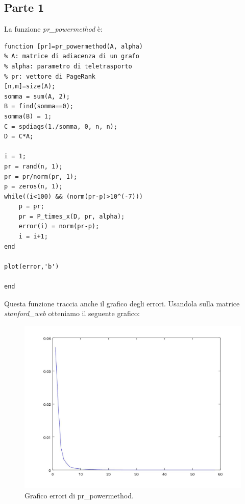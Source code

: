 \documentclass[11pt,a4paper,twoside,openright,titlepage,
                           headinclude,footinclude,BCOR5mm,
                           numbers=noenddot,cleardoublepage=empty,
                           tablecaptionabove]{scrbook}
\begin{document}
\subsection{\textbf{Parte 1}}
La funzione \emph{pr\_powermethod} è:
\begin{lstlisting}[frame=trBL]
function [pr]=pr_powermethod(A, alpha)
% A: matrice di adiacenza di un grafo
% alpha: parametro di teletrasporto
% pr: vettore di PageRank
[n,m]=size(A);
somma = sum(A, 2);
B = find(somma==0);
somma(B) = 1;
C = spdiags(1./somma, 0, n, n);
D = C*A;

i = 1;
pr = rand(n, 1);
pr = pr/norm(pr, 1);
p = zeros(n, 1);
while((i<100) && (norm(pr-p)>10^(-7)))
    p = pr;
    pr = P_times_x(D, pr, alpha);
    error(i) = norm(pr-p);
    i = i+1;
end

plot(error,'b')

end
\end{lstlisting}
Questa funzione traccia anche il grafico degli errori. Usandola sulla matrice \emph{stanford\_web} otteniamo il seguente grafico:
\begin{figure}[h!]
\begin{center}
\includegraphics[width=\textwidth]{figs/pr_powermethod.jpg}
\caption{Grafico errori di pr\_powermethod.}
\end{center}
\end{figure}

\newpage
\end{document}
